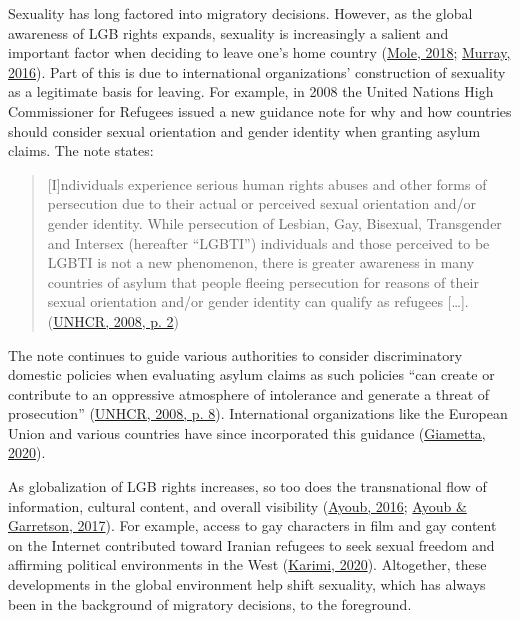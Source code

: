 \documentclass[
  11pt,
]{article}
\begin{document}
Sexuality has long factored into migratory decisions. However, as the global awareness of LGB rights expands, sexuality is increasingly a salient and important factor when deciding to leave one's home country (\protect\hyperlink{ref-mole_2018a}{Mole, 2018}; \protect\hyperlink{ref-murray_2016}{Murray, 2016}). Part of this is due to international organizations' construction of sexuality as a legitimate basis for leaving. For example, in 2008 the United Nations High Commissioner for Refugees issued a new guidance note for why and how countries should consider sexual orientation and gender identity when granting asylum claims. The note states:

\begin{quote}
{[}I{]}ndividuals experience serious human rights abuses and other forms of persecution due to their actual or perceived sexual orientation and/or gender identity. While persecution of Lesbian, Gay, Bisexual, Transgender and Intersex (hereafter ``LGBTI'') individuals and those perceived to be LGBTI is not a new phenomenon, there is greater awareness in many countries of asylum that people fleeing persecution for reasons of their sexual orientation and/or gender identity can qualify as refugees {[}\ldots{]}. (\protect\hyperlink{ref-unhcr_2008}{UNHCR, 2008, p. 2})
\end{quote}

The note continues to guide various authorities to consider discriminatory domestic policies when evaluating asylum claims as such policies ``can create or contribute to an oppressive atmosphere of intolerance and generate a threat of prosecution'' (\protect\hyperlink{ref-unhcr_2008}{UNHCR, 2008, p. 8}). International organizations like the European Union and various countries have since incorporated this guidance (\protect\hyperlink{ref-giametta_2020}{Giametta, 2020}).

As globalization of LGB rights increases, so too does the transnational flow of information, cultural content, and overall visibility (\protect\hyperlink{ref-ayoub_2016}{Ayoub, 2016}; \protect\hyperlink{ref-ayoub_2017}{Ayoub \& Garretson, 2017}). For example, access to gay characters in film and gay content on the Internet contributed toward Iranian refugees to seek sexual freedom and affirming political environments in the West (\protect\hyperlink{ref-karimi_2020}{Karimi, 2020}). Altogether, these developments in the global environment help shift sexuality, which has always been in the background of migratory decisions, to the foreground.
\end{document}
